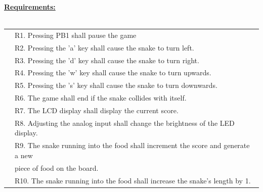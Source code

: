\documentclass[11pt]{article}
\begin{document}
    \noindent \textbf{\underline{Requirements:}} \\ \\
    \begin{tabular}{rl}
        \indent & R1. Pressing PB1 shall pause the game \\
        & R2. Pressing the 'a' key shall cause the snake to turn left. \\
        & R3. Pressing the 'd' key shall cause the snake to turn right. \\
        & R4. Pressing the 'w' key shall cause the snake to turn upwards. \\
        & R5. Pressing the 's' key shall cause the snake to turn downwards. \\
        & R6. The game shall end if the snake collides with itself. \\
        & R7. The LCD display shall display the current score. \\
        & R8. Adjusting the analog input shall change the brightness of the LED display. \\
        & R9. The snake running into the food shall increment the score and generate a new \\ 
        & piece of food on the board. \\         
        & R10. The snake running into the food shall increase the snake's length by 1.
    \end{tabular} \\
\end{document}
